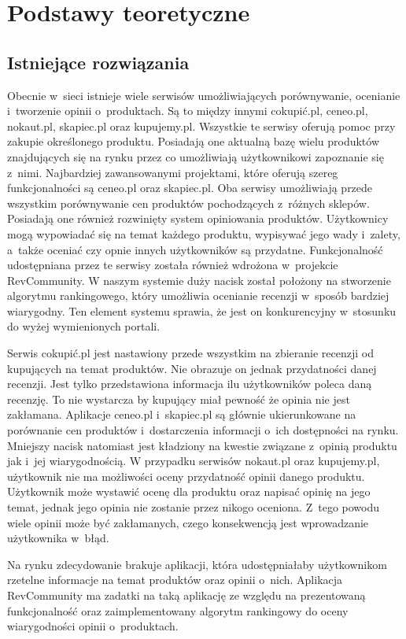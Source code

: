 \chapter{Podstawy teoretyczne}

\section{Istniejące rozwiązania}
Obecnie w~sieci istnieje wiele serwisów umożliwiających porównywanie, ocenianie i~tworzenie opinii o~produktach. Są to między innymi cokupić.pl,  ceneo.pl, nokaut.pl, skapiec.pl oraz kupujemy.pl. Wszystkie te serwisy oferują pomoc przy zakupie określonego produktu. Posiadają one aktualną bazę wielu produktów znajdujących się na rynku przez co umożliwiają użytkownikowi zapoznanie się z~nimi. Najbardziej zawansowanymi projektami, które oferują szereg funkcjonalności są ceneo.pl oraz skapiec.pl. Oba serwisy umożliwiają przede wszystkim porównywanie cen produktów pochodzących z~różnych sklepów. Posiadają one  również rozwinięty system opiniowania produktów. Użytkownicy mogą wypowiadać się na temat każdego produktu, wypisywać jego wady i~zalety, a~także oceniać czy opnie innych użytkowników są przydatne. Funkcjonalność udostępniana przez te serwisy została również wdrożona w~projekcie RevCommunity. W naszym systemie duży nacisk został położony na stworzenie algorytmu rankingowego, który umożliwia ocenianie recenzji w~sposób bardziej wiarygodny. Ten element systemu sprawia, że jest on konkurencyjny w~stosunku do wyżej wymienionych portali. 

Serwis cokupić.pl jest nastawiony przede wszystkim na zbieranie recenzji od kupujących na temat produktów. Nie obrazuje on jednak przydatności danej recenzji. Jest tylko przedstawiona informacja ilu użytkowników poleca daną recenzję. To nie wystarcza by kupujący miał pewność że opinia nie jest zakłamana. Aplikacje ceneo.pl i~skapiec.pl są głównie ukierunkowane na porównanie cen produktów i~dostarczenia informacji o~ich dostępności na rynku. Mniejszy nacisk natomiast jest kładziony na kwestie związane z~opinią produktu jak i~jej wiarygodnością.  W przypadku serwisów nokaut.pl oraz kupujemy.pl, użytkownik nie ma możliwości oceny przydatność opinii danego produktu. Użytkownik może wystawić ocenę dla produktu oraz napisać opinię na jego temat, jednak jego opinia nie zostanie przez nikogo oceniona. Z~tego powodu wiele opinii może być zakłamanych, czego konsekwencją jest wprowadzanie użytkownika w~błąd. 

Na rynku zdecydowanie brakuje aplikacji, która udostępniałaby użytkownikom rzetelne informacje na temat produktów oraz opinii o~nich. Aplikacja RevCommunity ma zadatki na taką aplikację ze względu na prezentowaną funkcjonalność oraz zaimplementowany algorytm rankingowy do oceny wiarygodności opinii o~produktach. 



